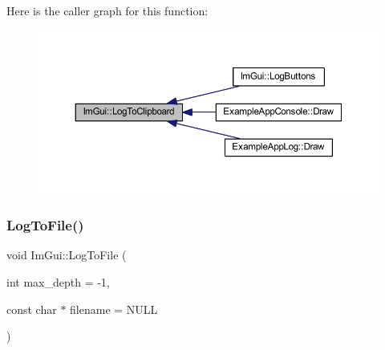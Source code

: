 Here is the caller graph for this function\+:
\nopagebreak
\begin{figure}[H]
\begin{center}
\leavevmode
\includegraphics[width=350pt]{namespace_im_gui_a81add991d176834b8a6e315dfc78e4f7_icgraph}
\end{center}
\end{figure}
\mbox{\label{namespace_im_gui_ab62461a65c153b9f40842debef8aa755}} 
\subsubsection{\texorpdfstring{Log\+To\+File()}{LogToFile()}}
{\footnotesize\ttfamily void Im\+Gui\+::\+Log\+To\+File (\begin{DoxyParamCaption}\item[{int}]{max\+\_\+depth = {\ttfamily -\/1},  }\item[{const char $\ast$}]{filename = {\ttfamily NULL} }\end{DoxyParamCaption})}

